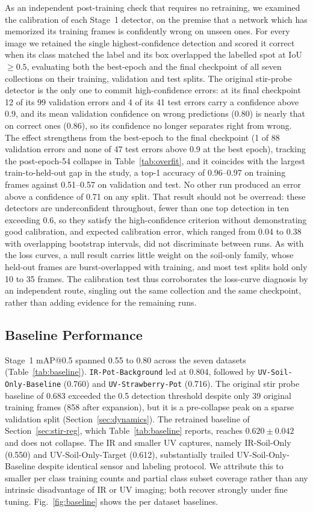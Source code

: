 ﻿\documentclass[journal]{IEEEtran}
\begin{document}
As an independent post-training check that requires no retraining, we examined the calibration of each Stage~1 detector, on the premise that a network which has memorized its training frames is confidently wrong on unseen ones. For every image we retained the single highest-confidence detection and scored it correct when its class matched the label and its box overlapped the labelled spot at IoU~$\geq 0.5$, evaluating both the best-epoch and the final checkpoint of all seven collections on their training, validation and test splits. The original stir-probe detector is the only one to commit high-confidence errors: at its final checkpoint 12 of its 99 validation errors and 4 of its 41 test errors carry a confidence above 0.9, and its mean validation confidence on wrong predictions (0.80) is nearly that on correct ones (0.86), so its confidence no longer separates right from wrong. The effect strengthens from the best-epoch to the final checkpoint (1 of 88 validation errors and none of 47 test errors above 0.9 at the best epoch), tracking the post-epoch-54 collapse in Table~\ref{tab:overfit}, and it coincides with the largest train-to-held-out gap in the study, a top-1 accuracy of 0.96--0.97 on training frames against 0.51--0.57 on validation and test. No other run produced an error above a confidence of 0.71 on any split. That result should not be overread: these detectors are underconfident throughout, fewer than one top detection in ten exceeding 0.6, so they satisfy the high-confidence criterion without demonstrating good calibration, and expected calibration error, which ranged from 0.04 to 0.38 with overlapping bootstrap intervals, did not discriminate between runs. As with the loss curves, a null result carries little weight on the soil-only family, whose held-out frames are burst-overlapped with training, and most test splits hold only 10 to 35 frames. The calibration test thus corroborates the loss-curve diagnosis by an independent route, singling out the same collection and the same checkpoint, rather than adding evidence for the remaining runs.

\subsection{Baseline Performance}
Stage~1 mAP@0.5 spanned 0.55 to 0.80 across the seven datasets (Table~\ref{tab:baseline}). \texttt{IR-Pot-Background} led at 0.804, followed by \texttt{UV-Soil-Only-Baseline} (0.760) and \texttt{UV-Strawberry-Pot} (0.716). The original stir probe baseline of 0.683 exceeded the 0.5 detection threshold despite only 39 original training frames (858 after expansion), but it is a pre-collapse peak on a sparse validation split (Section~\ref{sec:dynamics}). The retrained baseline of Section~\ref{sec:stir-reg}, which Table~\ref{tab:baseline} reports, reaches $0.620 \pm 0.042$ and does not collapse. The IR and smaller UV captures, namely IR-Soil-Only (0.550) and UV-Soil-Only-Target (0.612), substantially trailed UV-Soil-Only-Baseline despite identical sensor and labeling protocol. We attribute this to smaller per class training counts and partial class subset coverage rather than any intrinsic disadvantage of IR or UV imaging; both recover strongly under fine tuning. Fig.~\ref{fig:baseline} shows the per dataset baselines.
\end{document}
